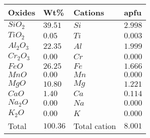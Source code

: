 \begin{tabular}{|l|l|l|l|}
\hline
\textbf{Oxides} & \textbf{Wt\%} & \textbf{Cations} & \textbf{apfu} \\
\hline
$SiO_2$ & $39.51$ & $Si$ & $2.998$ \\
\hline
$TiO_2$ & $0.05$ & $Ti$ & $0.003$ \\
\hline
$Al_2O_3$ & $22.35$ & $Al$ & $1.999$ \\
\hline
$Cr_2O_3$ & $0.00$ & $Cr$ & $0.000$ \\
\hline
$FeO$ & $26.25$ & $Fe$ & $1.666$ \\
\hline
$MnO$ & $0.00$ & $Mn$ & $0.000$ \\
\hline
$MgO$ & $10.80$ & $Mg$ & $1.221$ \\
\hline
$CaO$ & $1.40$ & $Ca$ & $0.114$ \\
\hline
$Na_2O$ & $0.00$ & $Na$ & $0.000$ \\
\hline
$K_2O$ & $0.00$ & $K$ & $0.000$ \\
\hline
Total & $100.36$ & Total cation & $8.001$ \\
\hline
\end{tabular}